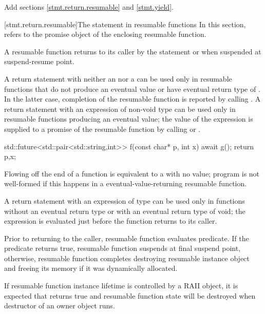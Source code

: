 Add sections \ref{stmt.return.resumable} and \ref{stmt.yield}.

[stmt.return.resumable]{The  statement in resumable functions}%
\enternote
In this section,  refers to the promise object
of the enclosing resumable function.
\exitnote

\pnum
A resumable function returns to its caller by the  statement
or when suspended at suspend-resume point.

\pnum
A return statement
with neither an  nor a 
can be used only in resumable functions
that do not produce an eventual value or have eventual return type of . In the latter case, completion of the resumable function
is reported by calling .
A return statement with an expression of non-void type can be used only
in resumable functions producing an eventual value; the value of the expression is supplied to a promise of the resumable function by calling 
 or
.

\enterexample

\begin{codeblock}
	std::future<std::pair<std::string,int>> f(const char* p, int x) {
		await g();
		return {p,x};
	}
\end{codeblock}
\exitexample

Flowing off the end of a function is equivalent to a  with
no value; program is not well-formed if this happens in a eventual-value-returning resumable function.

\pnum
A return statement with an expression of type 
can be used only in functions without an eventual return type 
or with an eventual return type of void; the expression is evaluated just before the function
returns to its caller.

\pnum
Prior to returning to the caller, resumable function evaluates
 predicate. If the predicate returns
true, resumable function suspends at final suspend point,
otherwise, resumable function completes destroying resumable instance
object and freeing its memory if it was dynamically allocated.

\enternote
If resumable function instance lifetime is controlled 
by a RAII object, it is expected that  returns true
and resumable function state will be destroyed when
destructor of an owner object runs.

